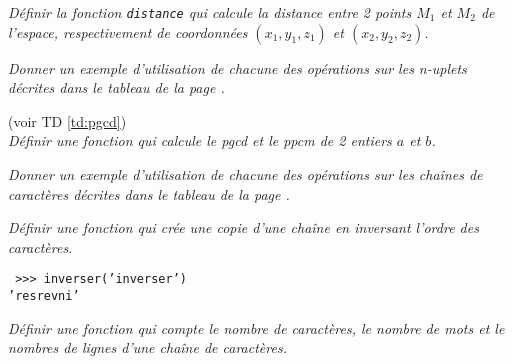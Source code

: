 

\begin{td}\label{td:distance}
\em
Définir la fonction {\tt distance} qui calcule la distance entre 2 points
$M_1$ et $M_2$ de l'espace, respectivement de coordonnées $(x_1,y_1,z_1)$ 
et $(x_2,y_2,z_2)$.
\end{td}

\begin{td}\label{td:n-uplet}
\em
Donner un exemple d'utilisation de chacune des opé\-ra\-tions  
sur les n-uplets décrites dans le tableau de la page \pageref{tab:sequences}.
\end{td}

\begin{td}\label{td:pgcdppcm}
(voir TD \ref{td:pgcd})\\
\em
Définir une fonction qui calcule le pgcd et le ppcm de 2 entiers $a$ et $b$.
\end{td}

\begin{td}\label{td:chaine}
\em
Donner un exemple d'utilisation de chacune des opé\-ra\-tions  
sur les chaînes de caractères décrites dans le tableau de la page \pageref{tab:chaines}.
\end{td}

\begin{td}\label{td:inverser}
\em
Définir une fonction qui crée une copie d'une chaîne en inversant l'ordre des caractères.

\noindent\mbox{}\hspace*{1cm}\begin{py}{6cm}\tt
>>> inverser('inverser')\\
'resrevni'
\end{py}
\end{td}

\begin{td}\label{td:wc}
\em
Définir une fonction qui compte le nombre de caractères, le nombre de mots et le nombres de lignes
d'une chaîne de caractères.
\end{td}


